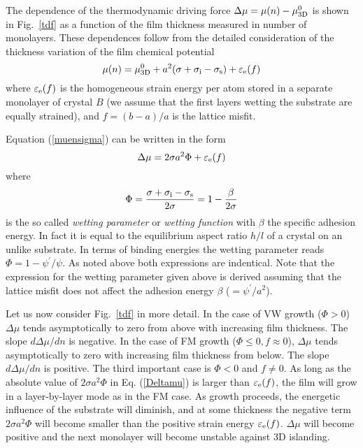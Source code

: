 \documentclass[aps,prl,showpacs,twocolumn,byrevtex,floatfix]{revtex4-1}
\begin{document}
The dependence of the thermodynamic driving force
$\Delta \mu = \mu (n) - \mu ^0_{\rm 3D}$ is shown in Fig.\ \ref{tdf} as a
function of the film thickness measured in number of monolayers.\cite{Prieto02}
These dependences follow from the detailed consideration of the thickness
variation of the film chemical potential\cite{Markov17}
\begin{equation}\label{muensigma}
\mu (n) = \mu^0_{\rm 3D} + a^2(\sigma + \sigma_{\rm i} -\sigma_{\rm s}) +
\varepsilon_{\rm e}(f)
\end{equation}
where $\varepsilon_{\rm e}(f)$ is the homogeneous strain energy per atom stored
in a separate monolayer of crystal $B$ (we assume that the first layers
wetting the substrate are equally strained), and $f = (b-a)/a$ is the lattice
misfit.

Equation (\ref{muensigma}) can be written in the form
\begin{equation}\label{Deltamu}
\Delta \mu = 2\sigma a^2 \Phi + \varepsilon_{\rm e}(f)
\end{equation}
where
\begin{equation}
\Phi = \frac{\sigma + \sigma_{\rm i} -\sigma_{\rm s}}{2\sigma} = 1 -
\frac{\beta}{2\sigma}
\end{equation}
is the so called {\it wetting parameter} or {\it wetting function} with $\beta$
the specific adhesion energy. In fact it is equal to the equilibrium aspect
ratio $h/l$ of a crystal on an unlike substrate.\cite{Bauer58} In terms
of binding energies the wetting parameter reads $\Phi = 1 -
\psi^{\prime}/\psi$.\cite{Kaischew50,Kaischew60} As noted above both expressions
are indentical.\cite{Markov17} Note that the expression for the wetting
parameter given above is derived assuming that the lattice misfit does not
affect the adhesion energy $\beta$ ($=\psi^{\prime}/a^2$).


Let us now consider Fig.\ \ref{tdf} in more detail. In the case of VW growth
($\Phi > 0$) $\Delta \mu$ tends asymptotically to zero from above with
increasing film thickness. The slope $d\Delta \mu /dn$ is negative. In the case
of FM growth ($\Phi \le 0, f \approx 0$), $\Delta \mu$ tends asymptotically to
zero with increasing film thickness from below. The slope $d\Delta \mu /dn$ is
positive. The third important case is
$\Phi < 0$ and $f \neq 0$. As long as the absolute value of $2\sigma a^2\Phi$ in
Eq. (\ref{Deltamu}) is larger than $\varepsilon_{\rm e}(f)$, the film will grow
in a layer-by-layer mode as in the FM case. As growth proceeds, the energetic
influence of the substrate will diminish, and at some thickness the negative
term $2\sigma a^2\Phi$ will become smaller than the positive strain energy
$\varepsilon_{\rm e}(f)$. $\Delta \mu$ will become positive and the next
monolayer will become unstable against 3D islanding.
\end{document}
